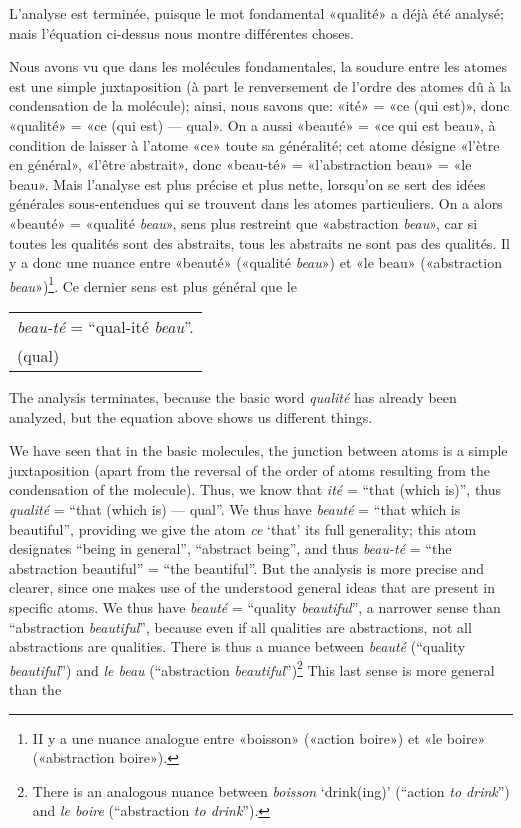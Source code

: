 \begin{sloppypar}
{  L’analyse est terminée, puisque le mot fondamental «qualité» a déjà
  été analysé; mais l’équation ci-dessus nous montre différentes
  choses.

  Nous avons vu que dans les molécules fondamentales, la soudure entre
  les atomes est une simple juxtaposition (à part le renversement de
  l’ordre des atomes dû à la condensation de la molécule); ainsi, nous
  savons que: «ité» = «ce (qui est)», donc «qualité» = «ce (qui est) —
  qual». On a aussi «beauté» = «ce qui est beau», à condition de
  laisser à l’atome «ce» toute sa généralité; cet atome désigne
  «l’ètre en général», «l’être abstrait», donc «beau-té» =
  «l’abstraction beau» = «le beau». Mais l’analyse est plus précise et
  plus nette, lorsqu’on se sert des idées générales sous-entendues qui
  se trouvent dans les atomes particuliers. On a alors «beauté» =
  «qualité \emph{beau}», sens plus restreint que «abstraction
  \emph{beau}», car si toutes les qualités sont des abstraits, tous
  les abstraits ne sont pas des qualités. Il y a donc une nuance entre
  «beauté» («qualité \emph{beau}») et «le beau» («abstraction
  \emph{beau}»)\footnote{II y a une nuance analogue entre «boisson»
    («action boire») et «le boire» («abstraction boire»).}. Ce dernier
  sens est plus général que le

}
%
{\noindent
  \begin{center}
    \begin{tabular}[t]{l}
      \emph{beau-té} = ``qual-ité \emph{beau}''.\\
      (qual)
    \end{tabular}
  \end{center}
  
  The analysis terminates, because the basic word \emph{qualité} has
  already been analyzed, but the equation above shows us different
  things.

  We have seen that in the basic molecules, the junction between atoms
  is a simple juxtaposition (apart from the reversal of the order of
  atoms resulting from the condensation of the molecule).  Thus, we
  know that \emph{ité} = ``that (which is)'', thus \emph{qualité} =
  ``that (which is) --- qual''. We thus have \emph{beauté} = ``that
  which is beautiful'', providing we give the atom \emph{ce} `that' its full
  generality; this atom designates ``being in general'', ``abstract
  being'', and thus \emph{beau-té} = ``the abstraction beautiful'' =
  ``the beautiful''. But the analysis is more precise and clearer,
  since one makes use of the understood general ideas that are present
  in specific atoms. We thus have \emph{beauté} = ``quality
  \emph{beautiful}'', a narrower sense than ``abstraction
  \emph{beautiful}'', because even if all qualities are abstractions,
  not all abstractions are qualities. There is thus a nuance between
  \emph{beauté} (``quality \emph{beautiful}'') and \emph{le beau}
  (``abstraction \emph{beautiful}'')\footnote{There is an analogous
    nuance between \emph{boisson} `drink(ing)' (``action \emph{to
      drink}'') and \emph{le boire} (``abstraction \emph{to drink}'').}
  This last sense is more general than the

}
\end{sloppypar}
